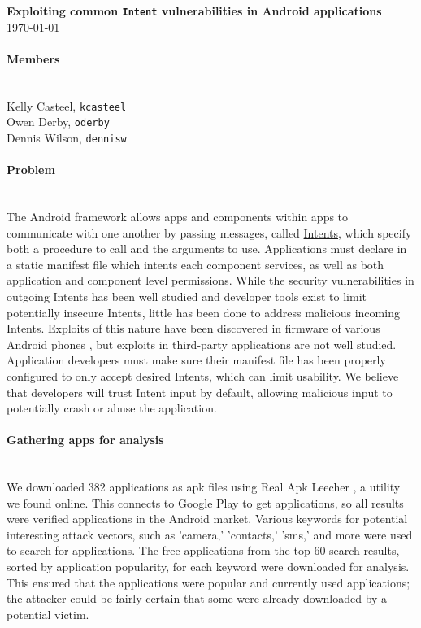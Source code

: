 \documentclass[12pt,a4paper]{article} \usepackage{verbatim}
\begin{document}
 

\flushleft\textbf{Exploiting common \texttt{Intent} vulnerabilities in Android %
applications}\\ \today\\

\paragraph{Members} ~\\

Kelly Casteel, \texttt{kcasteel}\\ Owen Derby, \texttt{oderby}\\ Dennis Wilson,
\texttt{dennisw}\\

\paragraph{Problem} ~\\

The Android framework allows apps and components within apps to communicate with
one another by passing messages, called
\href{https://developer.android.com/reference/android/content/Intent.html}{Intents},
which specify both a procedure to call and the arguments to use. Applications
must declare in a static manifest file which intents each component services, as
well as both application and component level permissions. While the security
vulnerabilities in outgoing Intents has been well studied
\cite{chin_analyzing_2011} and developer tools exist to limit potentially
insecure Intents, little has been done to address malicious incoming Intents.
Exploits of this nature have been discovered in firmware of various Android
phones \cite{grace_systematic_2012}, but exploits in third-party applications
are not well studied. Application developers must make sure their manifest file
has been properly configured to only accept desired Intents, which can limit
usability. We believe that developers will trust Intent input by default,
allowing malicious input to potentially crash or abuse the application.

\paragraph{Gathering apps for analysis} ~\\

We downloaded 382 applications as apk files using Real Apk Leecher
\cite{apkleecher}, a utility we found online. This connects to Google Play to
get applications, so all results were verified applications in the Android
market. Various keywords for potential interesting attack vectors, such as
'camera,' 'contacts,' 'sms,' and more were used to search for applications. The
free applications from the top 60 search results, sorted by application
popularity, for each keyword were downloaded for analysis. This ensured that the
applications were popular and currently used applications; the attacker could be
fairly certain that some were already downloaded by a potential victim.
\end{document}
